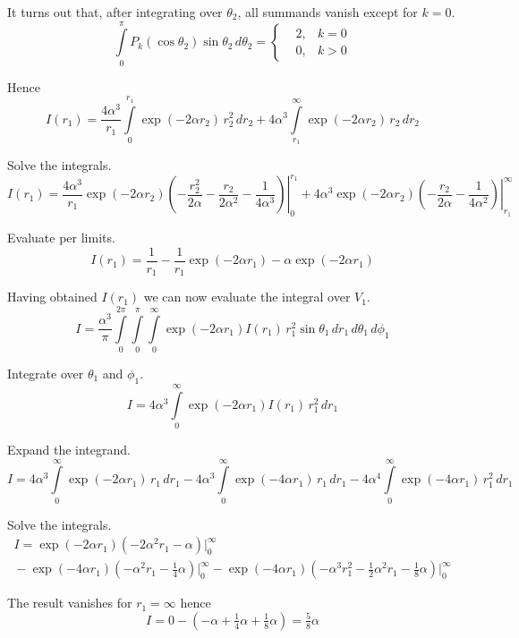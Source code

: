 \documentclass[12pt]{article}
\begin{document}
\noindent
It turns out that, after integrating over $\theta_2$, all summands vanish except for $k=0$.
\begin{equation*}
\int\limits_0^\pi P_k(\cos\theta_2)\sin\theta_2\,d\theta_2=
\left\{
\begin{aligned}
&2, & k=0
\\
&0, & k>0
\end{aligned}\right.
\end{equation*}

\noindent
Hence
\begin{equation*}
I(r_1)=
\frac{4\alpha^3}{r_1}\int\limits_0^{r_1}\exp(-2\alpha r_2)\,r_2^2\,dr_2
+4\alpha^3\int\limits_{r_1}^\infty\exp(-2\alpha r_2)\,r_2\,dr_2
\end{equation*}

\noindent
Solve the integrals.
\begin{equation*}
I(r_1)=
\frac{4\alpha^3}{r_1}
\left.
\exp(-2\alpha r_2)\left(-\frac{r_2^2}{2\alpha}-\frac{r_2}{2\alpha^2}-\frac{1}{4\alpha^3}
\right)\right|_0^{r_1}
+4\alpha^3\left.\exp(-2\alpha r_2)\left(-\frac{r_2}{2\alpha}-\frac{1}{4\alpha^2}\right)\right|_{r_1}^\infty
\end{equation*}

\noindent
Evaluate per limits.
\begin{equation*}
I(r_1)=\frac{1}{r_1}-\frac{1}{r_1}\exp(-2\alpha r_1)-\alpha\exp(-2\alpha r_1)
\end{equation*}

\noindent
Having obtained $I(r_1)$ we can now evaluate the integral over $V_1$.
\begin{equation*}
I=\frac{\alpha^3}{\pi}\int\limits_0^{2\pi}\int\limits_0^\pi\int\limits_0^\infty
\exp(-2\alpha r_1)I(r_1)\,r_1^2\sin\theta_1\,dr_1\,d\theta_1\,d\phi_1
\end{equation*}

\noindent
Integrate over $\theta_1$ and $\phi_1$.
\begin{equation*}
I=4\alpha^3\int\limits_0^\infty
\exp(-2\alpha r_1)I(r_1)\,r_1^2\,dr_1
\end{equation*}

\noindent
Expand the integrand.
\begin{equation*}
I=4\alpha^3\int\limits_0^\infty\exp(-2\alpha r_1)\,r_1\,dr_1
-4\alpha^3\int\limits_0^\infty\exp(-4\alpha r_1)\,r_1\,dr_1
-4\alpha^4\int\limits_0^\infty\exp(-4\alpha r_1)\,r_1^2\,dr_1
\end{equation*}

\noindent
Solve the integrals.
\begin{multline*}
I=\exp(-2\alpha r_1)\left(-2\alpha^2r_1-\alpha\right)\bigg|_0^\infty
\\
{}-\exp(-4\alpha r_1)(-\alpha^2r_1-\tfrac{1}{4}\alpha)\bigg|_0^\infty
{}-\exp(-4\alpha r_1)\left(-\alpha^3r_1^2-\tfrac{1}{2}\alpha^2r_1-\tfrac{1}{8}\alpha\right)\bigg|_0^\infty
\end{multline*}

\noindent
The result vanishes for $r_1=\infty$ hence
\begin{equation*}
I=0-\left(-\alpha+\tfrac{1}{4}\alpha+\tfrac{1}{8}\alpha\right)=\tfrac{5}{8}\alpha
\end{equation*}
\end{document}
